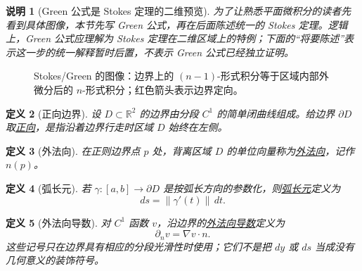 \documentclass[UTF8,fontset=none,a4paper,11pt]{ctexart}
\theoremstyle{foundation-definition}
\newtheorem{definition}{定义}[section]
\theoremstyle{foundation-theorem}
\theoremstyle{foundation-proposition}
\theoremstyle{foundation-example}
\theoremstyle{foundation-remark}
\newtheorem{remark}[definition]{说明}
\theoremstyle{foundation-theorem}
\newcommand{\term}[2]{\hyperref[#1]{#2}}
\begin{document}
\begin{remark}[Green 公式是 Stokes 定理的二维预览]
为了让熟悉平面微积分的读者先看到具体图像，本节先写 Green 公式，再在后面陈述统一的 Stokes 定理。逻辑上，Green 公式应理解为 Stokes 定理在二维区域上的特例；下面的“将要陈述”表示这一步的统一解释暂时后置，不表示 Green 公式已经独立证明。
\end{remark}

\begin{figure}[htbp]
\centering
{}
\caption{Stokes/Green 的图像：边界上的 \((n-1)\)-形式积分等于区域内部外微分后的 \(n\)-形式积分；红色箭头表示边界定向。}
\label{fig:stokes-boundary-region}
\end{figure}

\begin{definition}[正向边界]\label{def:positive-boundary}
设 \(D\subset\mathbb R^2\) 的边界由分段 \(C^1\) 的简单闭曲线组成。给边界
\(\partial D\) 取\term{def:positive-boundary}{正向}，是指沿着边界行走时区域 \(D\) 始终在左侧。
\end{definition}

\begin{definition}[外法向]\label{def:outward-normal}
在正则边界点 \(p\) 处，背离区域 \(D\) 的单位向量称为\term{def:outward-normal}{外法向}，记作 \(n(p)\)。
\end{definition}

\begin{definition}[弧长元]\label{def:arclength-element}
若 \(\gamma:[a,b]\to\partial D\) 是按弧长方向的参数化，则\term{def:arclength-element}{弧长元}定义为
\[
ds=\|\gamma'(t)\|\,dt.
\]
\end{definition}

\begin{definition}[外法向导数]\label{def:normal-derivative}
对 \(C^1\) 函数 \(v\)，沿边界的\term{def:normal-derivative}{外法向导数}定义为
\[
\partial_nv=\nabla v\cdot n.
\]
这些记号只在边界具有相应的分段光滑性时使用；它们不是把 \(dy\) 或 \(ds\) 当成没有几何意义的装饰符号。
\end{definition}
\end{document}
